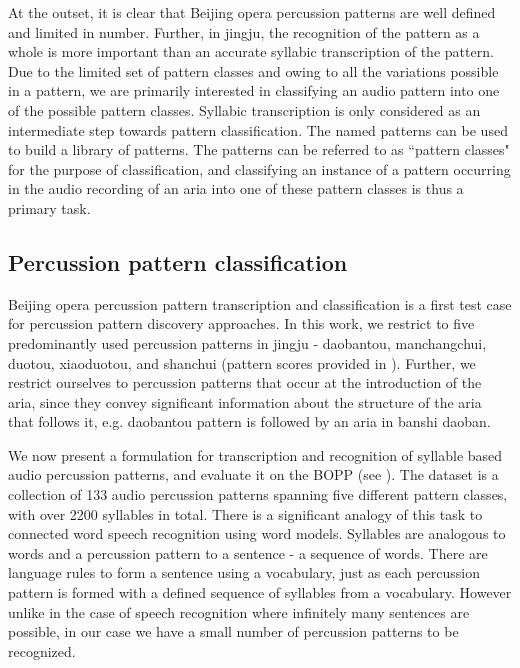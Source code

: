 At the outset, it is clear that Beijing opera percussion patterns are well defined and limited in number. Further, in \gls{jingju}, the recognition of the pattern as a whole is more important than an accurate syllabic transcription of the pattern. Due to the limited set of pattern classes and owing to all the variations possible in a pattern, we are primarily interested in classifying an audio pattern into one of the possible pattern classes. Syllabic transcription is only considered as an intermediate step towards pattern classification. The named patterns can be used to build a library of patterns. The patterns can be referred to as ``pattern classes" for the purpose of classification, and classifying an instance of a pattern occurring in the audio recording of an aria into one of these pattern classes is thus a primary task. 
% 
\subsection{Percussion pattern classification}
Beijing opera percussion pattern transcription and classification is a first test case for percussion pattern discovery approaches. In this work, we restrict to five predominantly used percussion patterns in \gls{jingju} - \gls{daobantou}, \gls{manchangchui}, \gls{duotou}, \gls{xiaoduotou}, and \gls{shanchui} (pattern scores provided in ). Further, we restrict ourselves to percussion patterns that occur at the introduction of the aria, since they convey significant information about the structure of the aria that follows it, e.g. \gls{daobantou} pattern is followed by an aria in \gls{banshi} \gls{daoban}. %

We now present a formulation for transcription and recognition of syllable based audio percussion patterns, and evaluate it on the \acrfull{BOPP} (see ). The dataset is a collection of 133 audio percussion patterns spanning five different pattern classes, with over 2200 syllables in total. There is a significant analogy of this task to connected word speech recognition using word models. Syllables are analogous to words and a percussion pattern to a sentence - a sequence of words. There are language rules to form a sentence using a vocabulary, just as each percussion pattern is formed with a defined sequence of syllables from a vocabulary. However unlike in the case of speech recognition where infinitely many sentences are possible, in our case we have a small number of percussion patterns to be recognized.

